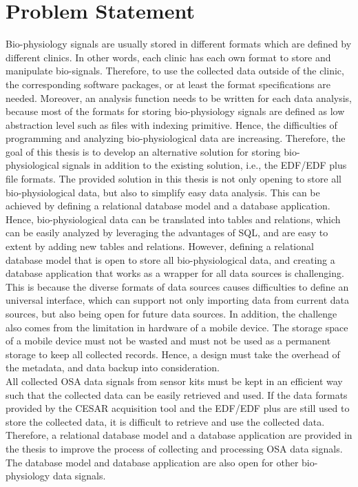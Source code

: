 \section{Problem Statement}
Bio-physiology signals are usually stored in different formats which are defined by different clinics. In other words, each clinic has each own format to store and manipulate bio-signals. Therefore, to use the collected data outside of the clinic, the corresponding software packages, or at least the format specifications are needed. Moreover, an analysis function needs to be written for each data analysis, because most of the formats for storing bio-physiology signals are defined as low abstraction level such as files with indexing primitive. Hence, the difficulties of programming and analyzing bio-physiological data are increasing. Therefore, the goal of this thesis is to develop an alternative solution for storing bio-physiological signals in addition to the existing solution, i.e., the EDF/EDF plus file formats. The provided solution in this thesis is not only opening to store all bio-physiological data, but also to simplify easy data analysis. This can be achieved by defining a relational database model and a database application. Hence, bio-physiological data can be translated into tables and relations, which can be easily analyzed by leveraging the advantages of SQL, and are easy to extent by adding new tables and relations. However, defining a relational database model that is open to store all bio-physiological data, and creating a database application that works as a wrapper for all data sources is challenging. This is because the diverse formats of data sources causes difficulties to define an universal interface, which can support not only importing data from current data sources, but also being open for future data sources. In addition, the challenge also comes from the limitation in hardware of a mobile device. The storage space of a mobile device must not be wasted and must not be used as a permanent storage to keep all collected records. Hence, a design must take the overhead of the metadata, and data backup into consideration.\\
All collected OSA data signals from sensor kits must be kept in an efficient way such that the collected data can be easily retrieved and used. If the data formats provided by the CESAR acquisition tool\citep{SP} and the EDF/EDF plus are still used to store the collected data, it is difficult to retrieve and use the collected data. Therefore, a relational database model and a database application are provided in the thesis to improve the process of collecting and processing OSA data signals. The database model and database application are also open for other bio-physiology data signals.

